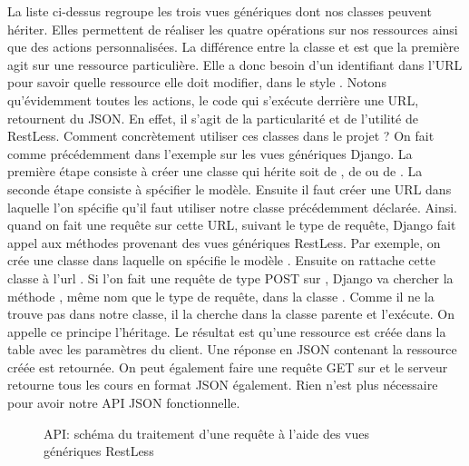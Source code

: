 \documentclass[a4paper,10pt,twoside]{sphinxmanual}
\begin{document}
La liste ci-dessus regroupe les trois vues génériques dont nos classes peuvent hériter. Elles permettent de réaliser les quatre opérations sur nos ressources ainsi que des actions personnalisées. La différence entre la classe  et  est que la première agit sur une ressource particulière. Elle a donc besoin d'un identifiant dans l'URL pour savoir quelle ressource elle doit modifier, dans le style . Notons qu'évidemment toutes les actions, le code qui s'exécute derrière une URL, retournent du JSON. En effet, il s'agit de la particularité et de l'utilité de RestLess. Comment concrètement utiliser ces classes dans le projet ? On fait comme précédemment dans l'exemple sur les vues génériques Django. La première étape consiste à créer une classe qui hérite soit de , de  ou de . La seconde étape consiste à spécifier le modèle. Ensuite il faut créer une URL dans laquelle l'on spécifie qu'il faut utiliser notre classe précédemment déclarée. Ainsi. quand on fait une requête sur cette URL, suivant le type de requête, Django fait appel aux méthodes provenant des vues génériques RestLess. Par exemple, on crée une classe  dans laquelle on spécifie le modèle . Ensuite on rattache cette classe à l'url . Si l'on fait une requête de type POST sur , Django va chercher la méthode , même nom que le type de requête, dans la classe . Comme il ne la trouve pas dans notre classe, il la cherche dans la classe parente  et l'exécute. On appelle ce principe l'héritage. Le résultat est qu'une ressource est créée dans la table  avec les paramètres du client. Une réponse en JSON contenant la ressource créée est retournée. On peut également faire une requête GET sur  et le serveur retourne tous les cours en format JSON également. Rien n'est plus nécessaire pour avoir notre API JSON fonctionnelle.
\begin{figure}[htbp]
\centering
\capstart

\caption{API: schéma du traitement d'une requête à l'aide des vues génériques RestLess}\end{figure}
\end{document}
